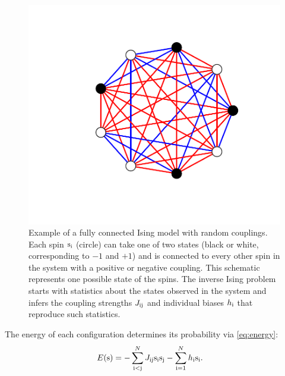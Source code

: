 \documentclass[aps,prl,twocolumn,nofootinbib]{revtex4-1}
\begin{document}
\begin{figure}[tbp]\centering
	\includegraphics[width=.85\linewidth,clip,trim={100 70 70 60}]{../images/ising_example}
\caption{Example of a fully connected Ising model with random couplings. Each spin ${\rm s}_{\rm i}$ (circle) can take one of two states (black or white, corresponding to $-1$ and $+1$) and is connected to every other spin in the system with a positive or negative coupling.  This schematic represents one possible state of the spins.  The inverse Ising problem starts with statistics about the states observed in the system and infers the coupling strengths $J_{\rm ij}$ and individual biases $h_{\rm i}$ that reproduce such statistics. }
\label{gr:ising}
\end{figure}

The energy of each configuration determines its probability via \eqref{eq:energy}:
\begin{align}
	E({\rm s}) &= -\sum_{\rm i<j}^N J_{\rm ij}{\rm s}_{\rm i}{\rm s}_{\rm j} -\sum_{\rm i=1}^Nh_{\rm i}{\rm s}_{\rm i}.
\end{align}
\end{document}

